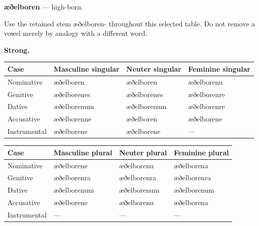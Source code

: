 \par\begin{minipage}{\linewidth}\raggedright
\textbf{æðelboren} — high-born.

Use the retained stem æðelboren- throughout this selected table. Do not remove a vowel merely by analogy with a different word.

\textbf{Strong.}

\par\begingroup
\fontsize{10.5}{13.2}\selectfont
\setlength{\LTleft}{0pt}\setlength{\LTright}{\fill}
\noindent
\begin{tabular}{@{}>{\raggedright\arraybackslash}p{22.0mm}>{\raggedright\arraybackslash}p{31.188mm}>{\raggedright\arraybackslash}p{31.188mm}>{\raggedright\arraybackslash}p{31.188mm}@{}}
\toprule
\textbf{Case} & \textbf{Masculine singular} & \textbf{Neuter singular} & \textbf{Feminine singular} \\
\midrule
Nominative & æðelboren & æðelboren & æðelborenu \\
Genitive & æðelborenes & æðelborenes & æðelborenre \\
Dative & æðelborenum & æðelborenum & æðelborenre \\
Accusative & æðelborenne & æðelboren & æðelborene \\
Instrumental & æðelborene & æðelborene & — \\
\bottomrule
\end{tabular}
\par\endgroup
\end{minipage}\par
\par\addvspace{5pt}
\par\begingroup
\fontsize{10.5}{13.2}\selectfont
\setlength{\LTleft}{0pt}\setlength{\LTright}{\fill}
\noindent
\begin{tabular}{@{}>{\raggedright\arraybackslash}p{22.0mm}>{\raggedright\arraybackslash}p{31.188mm}>{\raggedright\arraybackslash}p{31.188mm}>{\raggedright\arraybackslash}p{31.188mm}@{}}
\toprule
\textbf{Case} & \textbf{Masculine plural} & \textbf{Neuter plural} & \textbf{Feminine plural} \\
\midrule
Nominative & æðelborene & æðelborenu & æðelborena \\
Genitive & æðelborenra & æðelborenra & æðelborenra \\
Dative & æðelborenum & æðelborenum & æðelborenum \\
Accusative & æðelborene & æðelborenu & æðelborena \\
Instrumental & — & — & — \\
\bottomrule
\end{tabular}
\par\endgroup

